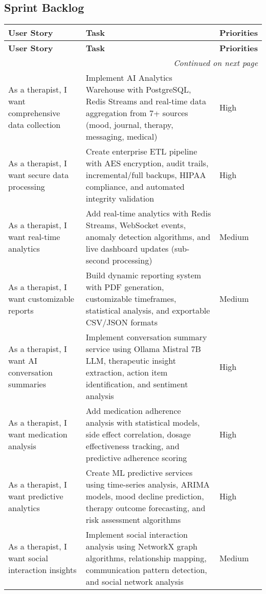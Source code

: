 \subsection{Sprint Backlog}
\begin{longtable}{|p{4.2cm}|p{7.2cm}|p{2.2cm}|}
\hline
\textbf{User Story} & \textbf{Task} & \textbf{Priorities} \\
\hline
\endfirsthead
\hline
\textbf{User Story} & \textbf{Task} & \textbf{Priorities} \\
\hline
\endhead
\hline
\multicolumn{3}{|r|}{\textit{Continued on next page}} \\
\hline
\endfoot
\hline
\endlastfoot
As a therapist, I want comprehensive data collection & Implement AI Analytics Warehouse with PostgreSQL, Redis Streams and real-time data aggregation from 7+ sources (mood, journal, therapy, messaging, medical) & High \\
\hline
As a therapist, I want secure data processing & Create enterprise ETL pipeline with AES encryption, audit trails, incremental/full backups, HIPAA compliance, and automated integrity validation & High \\
\hline
As a therapist, I want real-time analytics & Add real-time analytics with Redis Streams, WebSocket events, anomaly detection algorithms, and live dashboard updates (sub-second processing) & Medium \\
\hline
As a therapist, I want customizable reports & Build dynamic reporting system with PDF generation, customizable timeframes, statistical analysis, and exportable CSV/JSON formats & Medium \\
\hline
As a therapist, I want AI conversation summaries & Implement conversation summary service using Ollama Mistral 7B LLM, therapeutic insight extraction, action item identification, and sentiment analysis & High \\
\hline
As a therapist, I want medication analysis & Add medication adherence analysis with statistical models, side effect correlation, dosage effectiveness tracking, and predictive adherence scoring & High \\
\hline
As a therapist, I want predictive analytics & Create ML predictive services using time-series analysis, ARIMA models, mood decline prediction, therapy outcome forecasting, and risk assessment algorithms & High \\
\hline
As a therapist, I want social interaction insights & Implement social interaction analysis using NetworkX graph algorithms, relationship mapping, communication pattern detection, and social network analysis & Medium \\

\end{longtable}
